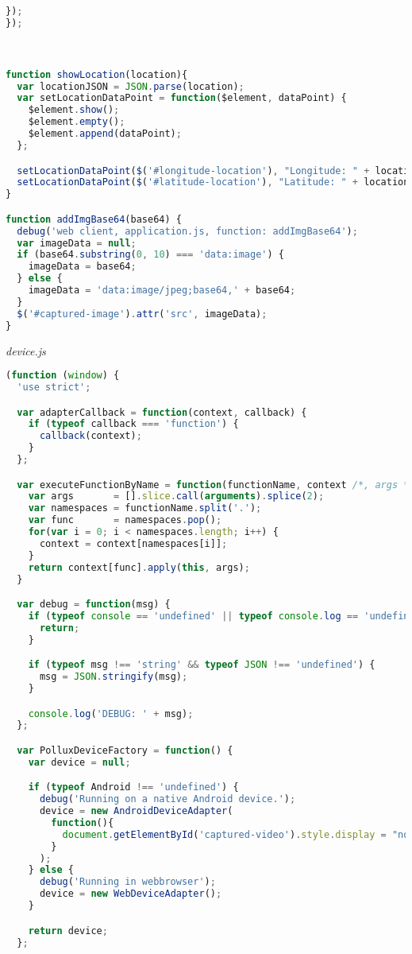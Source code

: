 \begin{appendices}
\begin{lstlisting}[language=JavaScript]
  });
});



function showLocation(location){
  var locationJSON = JSON.parse(location);
  var setLocationDataPoint = function($element, dataPoint) {
    $element.show();
    $element.empty();
    $element.append(dataPoint);
  };

  setLocationDataPoint($('#longitude-location'), "Longitude: " + locationJSON.longitude);
  setLocationDataPoint($('#latitude-location'), "Latitude: " + locationJSON.latitude);
}

function addImgBase64(base64) {
  debug('web client, application.js, function: addImgBase64');
  var imageData = null;
  if (base64.substring(0, 10) === 'data:image') {
    imageData = base64;
  } else {
    imageData = 'data:image/jpeg;base64,' + base64;
  }
  $('#captured-image').attr('src', imageData);
}
\end{lstlisting}
\emph{device.js}
\begin{lstlisting}[language=JavaScript]
(function (window) {
  'use strict';

  var adapterCallback = function(context, callback) {
    if (typeof callback === 'function') {
      callback(context);
    }
  };

  var executeFunctionByName = function(functionName, context /*, args */) {
    var args       = [].slice.call(arguments).splice(2);
    var namespaces = functionName.split('.');
    var func       = namespaces.pop();
    for(var i = 0; i < namespaces.length; i++) {
      context = context[namespaces[i]];
    }
    return context[func].apply(this, args);
  }

  var debug = function(msg) {
    if (typeof console == 'undefined' || typeof console.log == 'undefined') {
      return;
    }

    if (typeof msg !== 'string' && typeof JSON !== 'undefined') {
      msg = JSON.stringify(msg);
    }

    console.log('DEBUG: ' + msg);
  };

  var PolluxDeviceFactory = function() {
    var device = null;

    if (typeof Android !== 'undefined') {
      debug('Running on a native Android device.');
      device = new AndroidDeviceAdapter(
        function(){
          document.getElementById('captured-video').style.display = "none";
        }
      );
    } else {
      debug('Running in webbrowser');
      device = new WebDeviceAdapter();
    }

    return device;
  };


\end{lstlisting}
\end{appendices}
